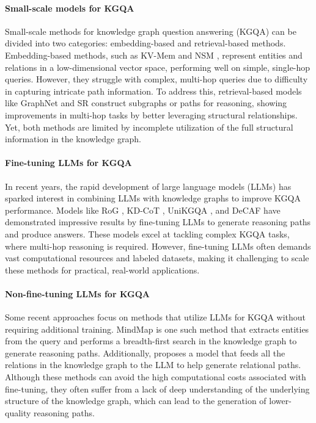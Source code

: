 \paragraph{Small-scale models for KGQA}

Small-scale methods for knowledge graph question answering (KGQA) can be divided into two categories: embedding-based and retrieval-based methods. Embedding-based methods, such as KV-Mem \cite{Miller2016KeyValueMN} and NSM \cite{He2021ImprovingMK}, represent entities and relations in a low-dimensional vector space, performing well on simple, single-hop queries. However, they struggle with complex, multi-hop queries due to difficulty in capturing intricate path information. To address this, retrieval-based models like GraphNet \cite{Sun2018OpenDQ} and SR \cite{Zhang2022SubgraphRE} construct subgraphs or paths for reasoning, showing improvements in multi-hop tasks by better leveraging structural relationships. Yet, both methods are limited by incomplete utilization of the full structural information in the knowledge graph.


\paragraph{Fine-tuning LLMs for KGQA}

In recent years, the rapid development of large language models (LLMs) has sparked interest in combining LLMs with knowledge graphs to improve KGQA performance. Models like RoG \cite{Luo2023ReasoningOG}, KD-CoT \cite{Wang2023KnowledgeDrivenCE}, UniKGQA \cite{Jiang2022UniKGQAUR}, and DeCAF \cite{Yu2022DecAFJD} have demonstrated impressive results by fine-tuning LLMs to generate reasoning paths and produce answers. These models excel at tackling complex KGQA tasks, where multi-hop reasoning is required. However, fine-tuning LLMs often demands vast computational resources and labeled datasets, making it challenging to scale these methods for practical, real-world applications.

\paragraph{Non-fine-tuning LLMs for KGQA}

Some recent approaches focus on methods that utilize LLMs for KGQA without requiring additional training. MindMap \citet{wen-etal-2024-mindmap} is one such method that extracts entities from the query and performs a breadth-first search in the knowledge graph to generate reasoning paths. Additionally, \citet{Chen2024ANP} proposes a model that feeds all the relations in the knowledge graph to the LLM to help generate relational paths. Although these methods can avoid the high computational costs associated with fine-tuning, they often suffer from a lack of deep understanding of the underlying structure of the knowledge graph, which can lead to the generation of lower-quality reasoning paths.